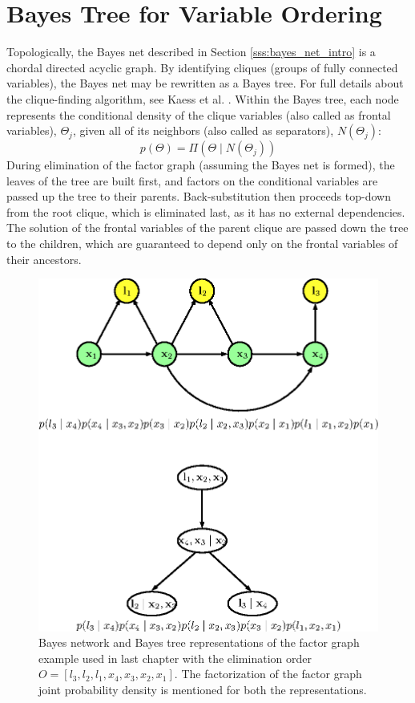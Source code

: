\section{Bayes Tree for Variable Ordering}
Topologically, the Bayes net described in Section \ref{sss:bayes_net_intro} is a chordal directed acyclic graph. By identifying cliques (groups of fully connected variables), the Bayes net may be rewritten as a Bayes tree. For full details about the clique-finding algorithm, see Kaess et al. \cite{kaessbayestree}. Within the Bayes tree, each node represents the conditional density of the clique variables (also called as frontal variables), $\Theta_j$, given all of its neighbors (also called as separators), $N(\Theta_j)$:
\begin{equation}
p(\Theta) = \Pi(\Theta \mid N(\Theta_j))
\end{equation}
During elimination of the factor graph (assuming the Bayes net is formed), the leaves of the tree are built first, and factors on the conditional variables are passed up the tree to their parents. Back-substitution then proceeds top-down from the root clique, which is eliminated last, as it has no external dependencies. The solution of the frontal variables of the parent clique are passed down the tree to the children, which are guaranteed to depend only on the frontal variables of their ancestors. 
\begin{figure}
\centering
\includegraphics{Chapters/figures3/bn_bt_factorization_vert}
\caption{Bayes network and Bayes tree representations of the factor graph example used in last chapter with the elimination order $O = [l_3, l_2, l_1, x_4, x_3, x_2, x_1]$. The factorization of the factor graph joint probability density is mentioned for both the representations.}
\label{fig:bn_bt_factorization}
\end{figure}
